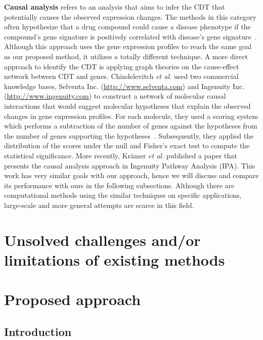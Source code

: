 \textbf{Causal analysis} refers to an analysis that aims to infer the CDT that potentially causes the observed expression changes. The methods in this category often hypothesize that a drug compound could cause a disease phenotype if the compound's gene signature is positively correlated with disease's gene signature~\cite{huang2013inferring}. Although this approach uses the gene expression profiles to reach the same goal as our proposed method, it utilizes a totally different technique. A more direct approach to identify the CDT is applying graph theories on the cause-effect network between CDT and genes. Chindelevitch \textit{et al.} used two commercial knowledge bases, Selventa Inc. (\href{http://www.selventa.com}{http://www.selventa.com}) and Ingenuity Inc. (\href{http://www.ingenuity.com}{http://www.ingenuity.com}) to construct a network of molecular causal interactions  that would suggest molecular hypotheses that explain the observed changes in gene expression profiles. For each molecule, they used a scoring system which performs a subtraction of  the number of genes against the hypotheses from the number of genes supporting the hypotheses~\cite{chindelevitch2012causal}. Subsequently, they applied the distribution of the scores under the null and Fisher's exact test to compute the statistical significance. More recently, Kr{\"a}mer \textit{et al.} published a paper that presents the causal analysis approach in Ingenuity Pathway Analysis (IPA). This work has very similar goals with our approach, hence we will discuss and compare its performance with ours in the following subsections. Although there are computational methods using the similar techniques on specific applications, %
large-scale and more general attempts are scarce in this field.



\section{Unsolved challenges and/or limitations of existing methods}

\section{Proposed approach}



\label{chap:PURE}

\subsection{Introduction}


